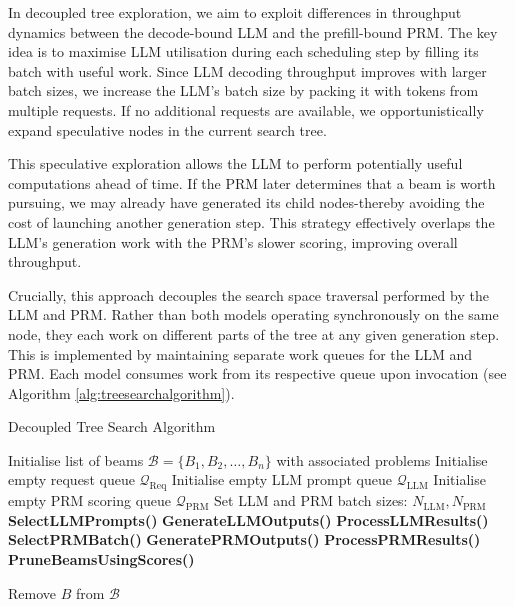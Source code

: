 \documentclass[11pt,twoside]{report}
\begin{document}
In decoupled tree exploration, we aim to exploit differences in throughput dynamics between the decode-bound LLM and the prefill-bound PRM. 
The key idea is to maximise LLM utilisation during each scheduling step by filling its batch with useful work. 
Since LLM decoding throughput improves with larger batch sizes, we increase the LLM’s batch size by packing it with tokens from multiple requests. 
If no additional requests are available, we opportunistically expand speculative nodes in the current search tree.

This speculative exploration allows the LLM to perform potentially useful computations ahead of time. 
If the PRM later determines that a beam is worth pursuing, we may already have generated its child nodes-thereby avoiding the cost of launching another generation step. 
This strategy effectively overlaps the LLM’s generation work with the PRM’s slower scoring, improving overall throughput.

Crucially, this approach decouples the search space traversal performed by the LLM and PRM. 
Rather than both models operating synchronously on the same node, they each work on different parts of the tree at any given generation step. 
This is implemented by maintaining separate work queues for the LLM and PRM. Each model consumes work from its respective queue upon invocation (see Algorithm \ref{alg:treesearchalgorithm}).

\begin{algorithm}[H]\label{alg:treesearchalgorithm}
\caption{Decoupled Tree Search Algorithm} 
\begin{algorithmic}[1]
\State Initialise list of beams $\mathcal{B} = \{B_1, B_2, \dots, B_n\}$ with associated problems
\State Initialise empty request queue $\mathcal{Q}_{\text{Req}}$
\State Initialise empty LLM prompt queue $\mathcal{Q}_{\text{LLM}}$
\State Initialise empty PRM scoring queue $\mathcal{Q}_{\text{PRM}}$
\State Set LLM and PRM batch sizes: $N_{\text{LLM}}, N_{\text{PRM}}$
    \State \textbf{SelectLLMPrompts()}
    \State \textbf{GenerateLLMOutputs()}
    \State \textbf{ProcessLLMResults()}
    \State \textbf{SelectPRMBatch()}
    \State \textbf{GeneratePRMOutputs()}
    \State \textbf{ProcessPRMResults()}
    \State \textbf{PruneBeamsUsingScores()}

        \State Remove $B$ from $\mathcal{B}$
      \EndIf
    \EndFor
\EndWhile
\end{algorithmic}
\end{algorithm}
\end{document}
